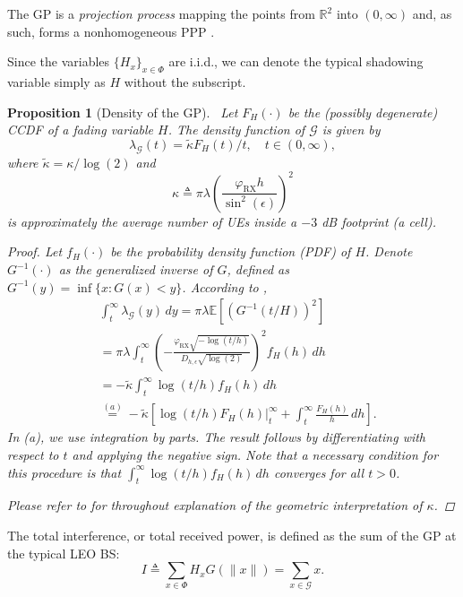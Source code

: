 \documentclass[lettersize,journal]{IEEEtran}
\newtheorem{prop}[theorem]{Proposition}
\begin{document}
The GP is a \textit{projection process} mapping the points from $\mathbb{R}^2$ into $(0,\infty)$ and, as such, forms a nonhomogeneous PPP \cite[Section 4.2.5]{alma998193414406526}.



Since the variables $\{H_x\}_{x \in \Phi}$ are i.i.d., we can denote the typical shadowing variable simply as $H$ without the subscript.
\begin{prop}[Density of the GP]\
  Let $F_H(\cdot)$ be the (possibly degenerate) CCDF of a fading variable $H$. The density function of $\mathcal{G}$ is given by
  \begin{equation}
    \label{eq:GPdensity}
    \lambda_{\mathcal{G}}(t) = \tilde{\kappa} {F_H(t)}/{t}, \quad t \in (0, \infty),
  \end{equation}
  where $\tilde{\kappa} = {\kappa}/{\log(2)}$ and
  \begin{equation}\kappa \triangleq \pi \lambda \left(\frac{\varphi_{\text{RX}}h}{\sin^2(\epsilon)}\right)^2
    \label{eq:kappa}
  \end{equation}
  is approximately the average number of UEs inside a $-3$ dB footprint (a cell).

  
  \begin{proof}
    Let $f_H(\cdot)$ be the probability density function (PDF) of $H$. Denote $G^{-1}(\cdot)$ as the generalized inverse of $G$, defined as $G^{-1}(y) = \inf \{x : G(x) < y\}$. According to \cite[Eq. (4.55)]{alma998193414406526},
    \begin{align*}
      &\int_t^{\infty} \lambda_{\mathcal{G}}(y) \, dy = \pi \lambda \mathbb{E}\left[ \left({G^{-1}(t/H)}{}\right)^2 \right] \\
      &= \pi \lambda \int_t^{\infty} \left(-\frac{\varphi_{\text{RX}} \sqrt{-\log(t/h)}}{D_{h,\epsilon} \sqrt{\log(2)}}\right)^2 f_H(h) \, dh \\
      &= -\tilde{\kappa} \int_t^{\infty} \log(t/h) f_H(h) \, dh \\
      &\overset{(a)}{=} -\tilde{\kappa} \left[ \left. \log(t/h) F_H(h) \right|_t^{\infty} + \int_t^{\infty} \frac{F_H(h)}{h} \, dh \right].
    \end{align*}
    In (a), we use integration by parts. The result follows by differentiating with respect to $t$ and applying the negative sign. Note that a necessary condition for this procedure is that $\int_t^{\infty} \log(t/h) f_H(h) \, dh$ converges for all $t > 0$.
    
    Please refer to \cite[Lemma 1]{10909705} for throughout explanation of the geometric interpretation of $\kappa$.
  \end{proof}
\end{prop}
The total interference, or total received power, is defined as the sum of the GP at the typical LEO BS:
\begin{equation}
  \label{eq:totpow}
  I \triangleq \sum_{x \in \Phi} H_x G(\|x\|) = \sum_{x \in \mathcal{G}} x.
\end{equation}
\end{document}
